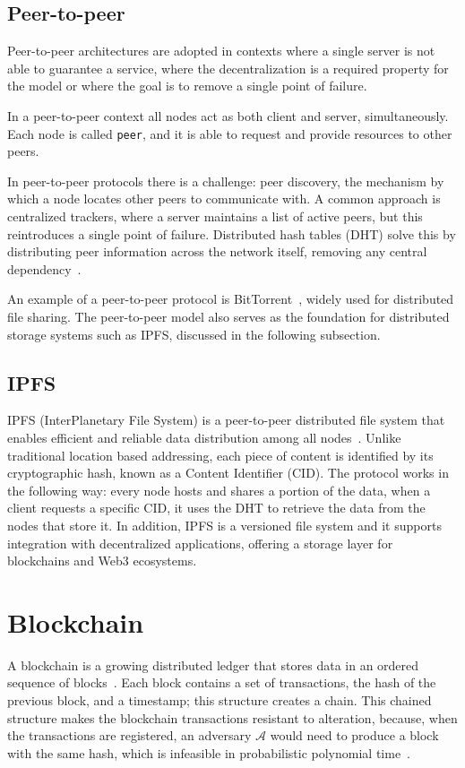 \subsection{Peer-to-peer} \label{subsec:peer-to-peer}
Peer-to-peer architectures are adopted in contexts where a single server is not able to guarantee a service, where the decentralization is a required property for the model or where the goal is to remove a single point of failure.~\cite{van2002distributed}

In a peer-to-peer context all nodes act as both client and server, simultaneously.
Each node is called \texttt{peer}, and it is able to request and provide resources to other peers.

In peer-to-peer protocols there is a challenge: peer discovery,
the mechanism by which a node locates other peers to communicate with.
A common approach is centralized trackers, where a server maintains a list
of active peers, but this reintroduces a single point of failure.
Distributed hash tables (DHT) solve this by distributing peer information
across the network itself, removing any central dependency~\cite{maymounkov2002kademlia}.

An example of a peer-to-peer protocol is BitTorrent~\cite{cohen2003incentives}, widely used for distributed file sharing.
The peer-to-peer model also serves as the foundation for distributed storage systems such as IPFS, discussed
in the following subsection.
\subsection{IPFS} \label{subsec:ipfs}
IPFS (InterPlanetary File System) is a peer-to-peer distributed file system that enables efficient and reliable data distribution among all nodes~\cite{benet2014ipfs}.
Unlike traditional location based addressing, each piece of content is identified by its cryptographic hash, known as a Content Identifier (CID).
The protocol works in the following way: every node hosts and shares a portion of the data, when a client requests a specific CID, it uses the DHT to retrieve the data from the nodes that store it.
In addition, IPFS is a versioned file system and it supports integration with decentralized applications, offering a storage layer for blockchains and Web3 ecosystems.
\section{Blockchain}\label{sec:blockchain}
A blockchain is a growing distributed ledger that stores data in an ordered sequence of blocks~\cite{bitcoin}.
Each block contains a set of transactions, the hash of the previous block, and a timestamp; this structure creates a chain.
This chained structure makes the blockchain transactions resistant to alteration, because, when the transactions are registered,
an adversary $\mathcal{A}$ would need to produce a block with the same hash, which is infeasible in probabilistic polynomial time~\cite{bitcoin}.

